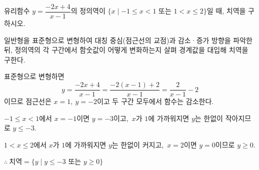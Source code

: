 \documentclass[10pt]{article}
\begin{document}

\newpage


\begin{dmproblem}
유리함수 $y = \dfrac{-2x + 4}{x - 1}$의 정의역이 $\{x \mid -1 \le x < 1 \text{ 또는 } 1 < x \le 2\}$일 때, 치역을 구하시오.
\end{dmproblem}

\begin{dmapproach}
일반형을 표준형으로 변형하여 대칭 중심(점근선의 교점)과 감소·증가 방향을 파악한 뒤, 정의역의 각 구간에서 함숫값이 어떻게 변화하는지 살펴 경계값을 대입해 치역을 구한다.
\end{dmapproach}

\begin{dmsolution}
표준형으로 변형하면
\begin{equation*}
  y = \frac{-2x + 4}{x - 1} = \frac{-2(x - 1) + 2}{x - 1} = \frac{2}{x - 1} - 2
\end{equation*}
이므로 점근선은 $x = 1,\ y = -2$이고 두 구간 모두에서 함수는 감소한다.

$-1 \le x < 1$에서 $x = -1$이면 $y = -3$이고,\ $x$가 $1$에 가까워지면 $y$는 한없이 작아지므로 $y \le -3$.

$1 < x \le 2$에서 $x$가 $1$에 가까워지면 $y$는 한없이 커지고,\ $x = 2$이면 $y = 0$이므로 $y \ge 0$.

$\therefore\ \text{치역} = \{y \mid y \le -3 \text{ 또는 } y \ge 0\}$
\end{dmsolution}

\dmchecktitle



\newpage

\end{document}
